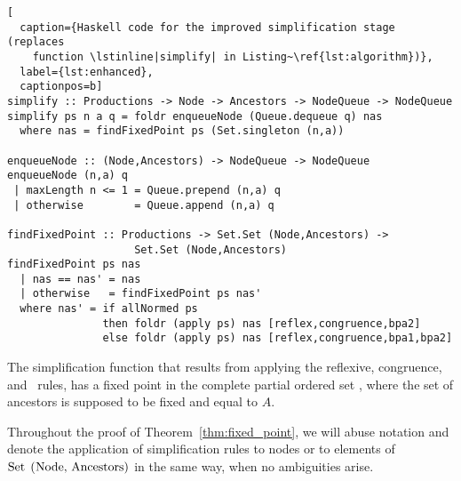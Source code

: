 \begin{lstlisting}[
  caption={Haskell code for the improved simplification stage (replaces
    function \lstinline|simplify| in Listing~\ref{lst:algorithm})},
  label={lst:enhanced},
  captionpos=b]
simplify :: Productions -> Node -> Ancestors -> NodeQueue -> NodeQueue
simplify ps n a q = foldr enqueueNode (Queue.dequeue q) nas
  where nas = findFixedPoint ps (Set.singleton (n,a))

enqueueNode :: (Node,Ancestors) -> NodeQueue -> NodeQueue
enqueueNode (n,a) q
 | maxLength n <= 1 = Queue.prepend (n,a) q
 | otherwise        = Queue.append (n,a) q

findFixedPoint :: Productions -> Set.Set (Node,Ancestors) -> 
                    Set.Set (Node,Ancestors)
findFixedPoint ps nas
  | nas == nas' = nas
  | otherwise   = findFixedPoint ps nas'
  where nas' = if allNormed ps
               then foldr (apply ps) nas [reflex,congruence,bpa2]
               else foldr (apply ps) nas [reflex,congruence,bpa1,bpa2]
\end{lstlisting}

\begin{theorem}
\label{thm:fixed_point}
	The simplification function that results from applying the reflexive,
	congruence, and \BPA\ rules, has a fixed point in the complete partial
	ordered set , where the set of ancestors
	is supposed to be fixed and equal to $A$.
\end{theorem}

Throughout the proof of Theorem~\ref{thm:fixed_point}, we will abuse 
notation and denote the application of simplification rules
to nodes or to elements of $\text{\lstinline{Set (Node, Ancestors)}}$
in the same way, when no ambiguities arise.

